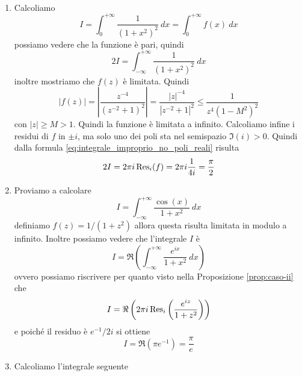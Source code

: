 \begin{example}\
  \begin{enumerate}
    \item Calcoliamo 
      \begin{equation*}
        I = \int_{0}^{+\infty} \frac{1}{(1+x^2)^2}\ dx = \int_{0}^{+\infty}
        f(x)\ dx
      \end{equation*}
      possiamo vedere che la funzione è pari, quindi 
      \begin{equation*}
        2I = \int_{-\infty}^{+\infty} \frac{1}{(1+x^2)^2}\ dx
      \end{equation*}
      inoltre mostriamo che $f(z)$ è limitata. Quindi 
      \begin{equation*}
        |f(z)| = \left|\frac{z^{-4}}{(z^{-2}+1)^2}\right|
        = \frac{|z|^{-4}}{|z^{-2}+1|^2} \le \frac{1}{z^{4}(1-M^2)^2}
      \end{equation*}
      con $|z| \ge M > 1$. Quindi la funzione è limitata a infinito. Calcoliamo
      infine i residui di $f$ in $\pm i$, ma solo uno dei poli sta nel
      semispazio $\Im(i) > 0$. Quindi dalla formula
      \eqref{eq:integrale_improprio_no_poli_reali} risulta
      \begin{equation*}
        2I = 2\pi i \operatorname{Res}_{i}(f) = 2\pi i \frac{1}{4i} = \frac{\pi}{2}
      \end{equation*}
    \item Proviamo a calcolare 
      \begin{equation*}
        I = \int_{-\infty}^{+\infty} \frac{\cos(x)}{1+x^2}\ dx  
      \end{equation*}
      definiamo $f(z) = 1/(1+z^2)$ allora questa risulta limitata in modulo
      a infinito. Inoltre possiamo vedere che l'integrale $I$ è 
      \begin{equation*}
        I = \Re\left( \int_{-\infty}^{+\infty} \frac{e^{ix}}{1+x^2} \ dx\right)
      \end{equation*}
      ovvero possiamo riscrivere per quanto visto nella Proposizione \ref{prop:caso-ii} che 
      \begin{equation*}
        I = \Re\left( 2\pi i \operatorname{Res}_{i} \left(\frac{e^{iz}}{1+z^2} \right) \right)
      \end{equation*}
      e poiché il residuo è $e^{-1}/2i$ si ottiene 
      \begin{equation*}
        I = \Re\left( \pi e^{-1} \right) = \frac{\pi}{e}
      \end{equation*}
    \item Calcoliamo l'integrale seguente 

\end{enumerate}
\end{example}
